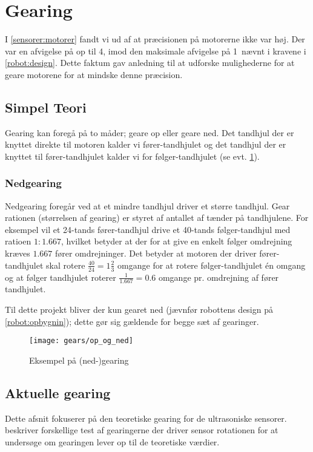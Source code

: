 \section{Gearing}\label{robot:gearing}
I \cref{sensorer:motorer} fandt vi ud af at præcisionen på motorerne ikke var høj.
Der var en afvigelse på op til 4\dg, imod den maksimale afvigelse på 1\dg ~nævnt i kravene i \cref{robot:design}.
Dette faktum gav anledning til at udforske mulighederne for at geare motorene for at mindske denne præcision.

\subsection{Simpel Teori}\label{gearing:simpel_teori}
Gearing kan foregå på to måder; geare op eller geare ned.
Det tandhjul der er knyttet direkte til motoren kalder vi fører-tandhjulet og det tandhjul der er knyttet til fører-tandhjulet kalder vi for følger-tandhjulet (se evt. \cref{gearing:nedgearing}).

\subsubsection{Nedgearing}
Nedgearing foregår ved at et mindre tandhjul driver et større tandhjul.
Gear rationen (størrelsen af gearing) er styret af antallet af tænder på tandhjulene.
For eksempel vil et 24-tands fører-tandhjul drive et 40-tands følger-tandhjul med ratioen $1:1.667$, hvilket betyder at der for at give en enkelt følger omdrejning kræves $1.667$ fører omdrejninger. 
Det betyder at motoren der driver fører-tandhjulet skal rotere $\frac{40}{24} = 1 \frac{2}{3}$ omgange for at rotere følger-tandhjulet én omgang og at følger tandhjulet roterer $\frac{1}{1.667} = 0.6$ omgange pr. omdrejning af fører tandhjulet.

Til dette projekt bliver der kun gearet ned (jævnfør robottens design på \cref{robot:opbygnin}); dette gør sig gældende for begge sæt af gearinger.


\begin{figure}[h]
\centering
\texttt{[image: gears/op\_og\_ned]}
\caption{Eksempel på (ned-)gearing}
\label{gearing:nedgearing}
\end{figure}

\subsection{Aktuelle gearing}
Dette afsnit fokuserer på den teoretiske gearing for de ultrasoniske sensorer.
 beskriver forskellige test af gearingerne der driver sensor rotationen for at undersøge om gearingen lever op til de teoretiske værdier.


